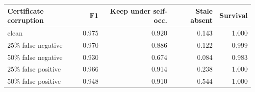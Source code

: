 \begin{tabular}{lrrrr}
\hline
Certificate corruption & F1 & Keep under self-occ. & Stale absent & Survival \\
\hline
clean & 0.975 & 0.920 & 0.143 & 1.000 \\
25\% false negative & 0.970 & 0.886 & 0.122 & 0.999 \\
50\% false negative & 0.930 & 0.674 & 0.084 & 0.983 \\
25\% false positive & 0.966 & 0.914 & 0.238 & 1.000 \\
50\% false positive & 0.948 & 0.910 & 0.544 & 1.000 \\
\hline
\end{tabular}
